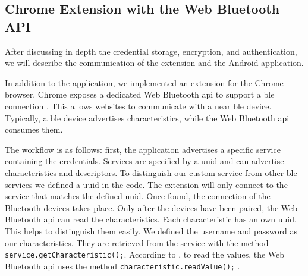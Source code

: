 
\subsection{Chrome Extension with the Web Bluetooth API}
After discussing in depth the credential storage, encryption, and authentication, we will describe the communication of the extension and the Android application.

In addition to the application, we implemented an extension for the Chrome browser. Chrome exposes a dedicated Web Bluetooth \gls{api} to support a \gls{ble} connection \cite{WebBTAPI}. This allows websites to communicate with a near \gls{ble} device. Typically, a \gls{ble} device advertises characteristics, while the Web Bluetooth \gls{api} consumes them.

The workflow is as follows: first, the application advertises a specific service containing the credentials. Services are specified by a \gls{uuid} and can advertise characteristics and descriptors. To distinguish our custom service from other \gls{ble} services we defined a \gls{uuid} in the code. The extension will only connect to the service that matches the defined \gls{uuid}. Once found, the connection of the Bluetooth devices takes place. Only after the devices have been paired, the Web Bluetooth \gls{api} can read the characteristics. Each characteristic has an own \gls{uuid}. This helps to distinguish them easily. We defined the username and password as our characteristics. They are retrieved from the service with the method \texttt{service.getCharacteristic();}. According to \cite{WebBTAPI}, to read the values, the Web Bluetooth \gls{api} uses the method \texttt{characteristic.readValue();} .
